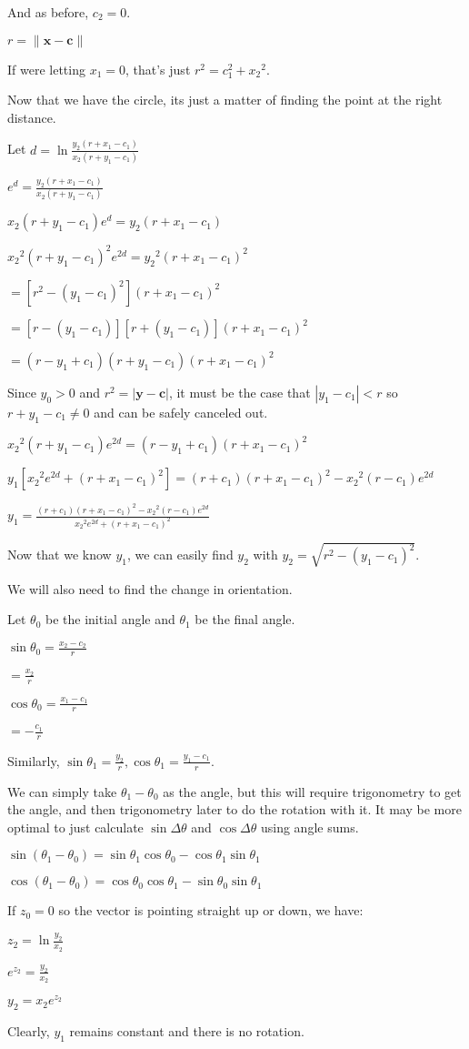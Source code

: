 \documentclass[12pt]{amsart}
\begin{document}
And as before, $c_2 = 0$.

$r = \|\textbf{x}-\textbf{c}\|$

If were letting $x_1 = 0$, that's just $r^2 = c_1^2+{x_2}^2$.

Now that we have the circle, its just a matter of finding the point at the right distance.

Let $d = \ln\frac{y_2(r+x_1-c_1)}{x_2(r+y_1-c_1)}$

$e^d = \frac{y_2(r+x_1-c_1)}{x_2(r+y_1-c_1)}$

$x_2(r+y_1-c_1)e^d = y_2(r+x_1-c_1)$

${x_2}^2(r+y_1-c_1)^2e^{2d} = {y_2}^2(r+x_1-c_1)^2$

$= [r^2-(y_1-c_1)^2](r+x_1-c_1)^2$

$= [r-(y_1-c_1)][r+(y_1-c_1)](r+x_1-c_1)^2$

$= (r-y_1+c_1)(r+y_1-c_1)(r+x_1-c_1)^2$

Since $y_0 > 0$ and $r^2 = |\textbf{y}-\textbf{c}|$, it must be the case that $|y_1-c_1| < r$ so $r+y_1-c_1 \neq 0$ and can be safely canceled out.

${x_2}^2(r+y_1-c_1)e^{2d} = (r-y_1+c_1)(r+x_1-c_1)^2$

$y_1[{x_2}^2e^{2d}+(r+x_1-c_1)^2] = (r+c_1)(r+x_1-c_1)^2-{x_2}^2(r-c_1)e^{2d}$

$y_1 = \frac{(r+c_1)(r+x_1-c_1)^2-{x_2}^2(r-c_1)e^{2d}}{{x_2}^2e^{2d}+(r+x_1-c_1)^2}$

Now that we know $y_1$, we can easily find $y_2$ with $y_2 = \sqrt{r^2-({y_1}-c_1)^2}$.

We will also need to find the change in orientation.

Let $\theta_0$ be the initial angle and $\theta_1$ be the final angle.

$\sin \theta_0 = \frac{x_2-c_2}{r}$

$= \frac{x_2}{r}$

$\cos \theta_0 = \frac{x_1-c_1}{r}$

$= -\frac{c_1}{r}$

Similarly, $\sin \theta_1 = \frac{y_2}{r}, \cos \theta_1 = \frac{y_1-c_1}{r}$.

We can simply take $\theta_1-\theta_0$ as the angle, but this will require trigonometry to get the angle, and then trigonometry later to do the rotation with it. It may be more optimal to just calculate $\sin \Delta\theta$ and $\cos \Delta\theta$ using angle sums.

$\sin(\theta_1-\theta_0) = \sin\theta_1 \cos\theta_0 - \cos\theta_1 \sin\theta_1$

$\cos(\theta_1-\theta_0) = \cos\theta_0 \cos\theta_1 - \sin\theta_0 \sin\theta_1$

If $z_0 = 0$ so the vector is pointing straight up or down, we have:

$z_2 = \ln\frac{y_2}{x_2}$

$e^{z_2} = \frac{y_2}{x_2}$

$y_2 = x_2e^{z_2}$

Clearly, $y_1$ remains constant and there is no rotation.
\end{document}
